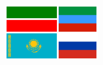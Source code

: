 \documentclass[a0paper,fontscale=0.3]{baposter}  %
\begin{document}
\begin{poster}
{			%

		}{
				\includegraphics[height=6.5em]{flags/flags}
		}



\end{poster}
\end{document}

